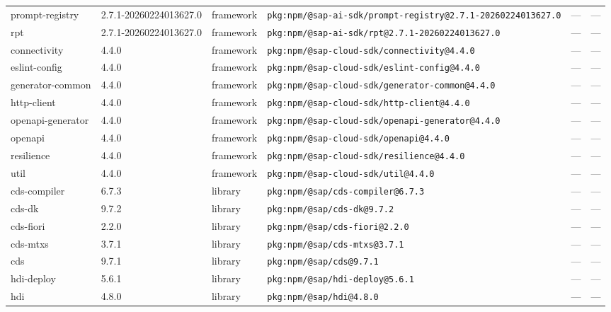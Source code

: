 \documentclass[11pt,a4paper]{article}
\begin{document}
\begin{longtable}{|p{4cm}|p{2cm}|p{1.6cm}|p{5cm}|p{1.5cm}|p{3.5cm}|}
\raggedright prompt-registry & 2.7.1-20260224013627.0 & framework & \small\texttt{pkg:npm/@sap-ai-sdk/prompt-registry@2.7.1-20260224013627.0} & — & \small — \\
\raggedright rpt & 2.7.1-20260224013627.0 & framework & \small\texttt{pkg:npm/@sap-ai-sdk/rpt@2.7.1-20260224013627.0} & — & \small — \\
\raggedright connectivity & 4.4.0 & framework & \small\texttt{pkg:npm/@sap-cloud-sdk/connectivity@4.4.0} & — & \small — \\
\raggedright eslint-config & 4.4.0 & framework & \small\texttt{pkg:npm/@sap-cloud-sdk/eslint-config@4.4.0} & — & \small — \\
\raggedright generator-common & 4.4.0 & framework & \small\texttt{pkg:npm/@sap-cloud-sdk/generator-common@4.4.0} & — & \small — \\
\raggedright http-client & 4.4.0 & framework & \small\texttt{pkg:npm/@sap-cloud-sdk/http-client@4.4.0} & — & \small — \\
\raggedright openapi-generator & 4.4.0 & framework & \small\texttt{pkg:npm/@sap-cloud-sdk/openapi-generator@4.4.0} & — & \small — \\
\raggedright openapi & 4.4.0 & framework & \small\texttt{pkg:npm/@sap-cloud-sdk/openapi@4.4.0} & — & \small — \\
\raggedright resilience & 4.4.0 & framework & \small\texttt{pkg:npm/@sap-cloud-sdk/resilience@4.4.0} & — & \small — \\
\raggedright util & 4.4.0 & framework & \small\texttt{pkg:npm/@sap-cloud-sdk/util@4.4.0} & — & \small — \\
\raggedright cds-compiler & 6.7.3 & library & \small\texttt{pkg:npm/@sap/cds-compiler@6.7.3} & — & \small — \\
\raggedright cds-dk & 9.7.2 & library & \small\texttt{pkg:npm/@sap/cds-dk@9.7.2} & — & \small — \\
\raggedright cds-fiori & 2.2.0 & library & \small\texttt{pkg:npm/@sap/cds-fiori@2.2.0} & — & \small — \\
\raggedright cds-mtxs & 3.7.1 & library & \small\texttt{pkg:npm/@sap/cds-mtxs@3.7.1} & — & \small — \\
\raggedright cds & 9.7.1 & library & \small\texttt{pkg:npm/@sap/cds@9.7.1} & — & \small — \\
\raggedright hdi-deploy & 5.6.1 & library & \small\texttt{pkg:npm/@sap/hdi-deploy@5.6.1} & — & \small — \\
\raggedright hdi & 4.8.0 & library & \small\texttt{pkg:npm/@sap/hdi@4.8.0} & — & \small — \\

\end{longtable}
\end{document}
